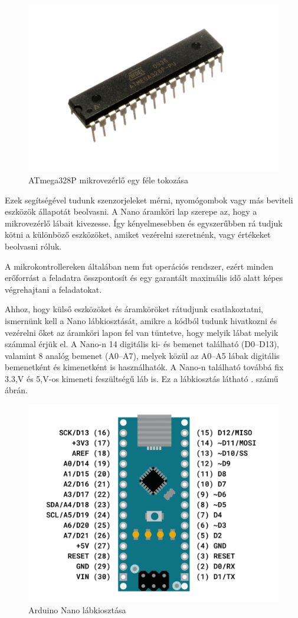 \documentclass[]{thesis-ekf}
\theoremstyle{definition}
\theoremstyle{remark}
\begin{document}
	\begin{figure}[th!]
		\centering
		\includegraphics[width=0.4\linewidth]{ATMEGA328P-PU}
		\caption[ATmega328P]{ATmega328P mikrovezérlő egy féle tokozása}
		\label{fig:atmega328p-pu}
	\end{figure}
	
	Ezek segítségével tudunk szenzorjeleket mérni, nyomógombok vagy más beviteli eszközök állapotát beolvasni. A Nano áramköri lap szerepe az, hogy a mikrovezérlő lábait kivezesse. Így kényelmesebben és egyszerűbben rá tudjuk kötni a különböző eszközöket, amiket vezérelni szeretnénk, vagy értékeket beolvasni róluk. 
	
	A mikrokontrollereken általában nem fut operációs rendszer, ezért minden erőforrást a feladatra összpontosít és egy garantált maximális idő alatt képes végrehajtani a feladatokat. 
	
	Ahhoz, hogy külső eszközöket és áramköröket rátudjunk csatlakoztatni, ismernünk kell a Nano lábkiosztását, amikre a kódból tudunk hivatkozni és vezérelni őket az áramköri lapon fel van tüntetve, hogy melyik lábat melyik számmal érjük el.  A Nano-n 14 digitális ki- és bemenet található (D0–D13), valamint 8 analóg bemenet (A0–A7), melyek közül az A0–A5 lábak digitális bemenetként és kimenetként is használhatók. A Nano-n található továbbá fix 3.3,V és 5,V-os kimeneti feszültségű láb is. Ez a lábkiosztás látható . számű ábrán.
	
	\begin{figure}[th!]
		\centering
		\includegraphics[width=0.7\linewidth]{arduino-nano-pinout}
		\caption[Nano felépítés]{Arduino Nano lábkiosztása}
		\label{fig:arduino-nano-pinout}
	\end{figure}
	
\end{document}
